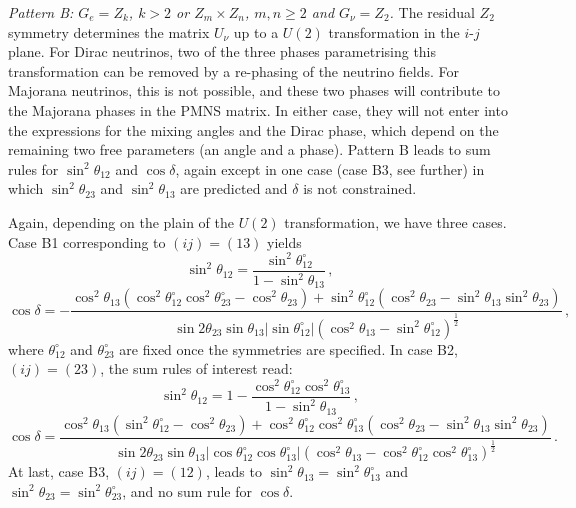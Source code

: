 \documentclass[11pt,a4paper]{article}
\newcommand{\be}{\begin{equation}}
\newcommand{\ee}{\end{equation}}
\def\th{\theta}
\numberwithin{equation}{section}
\begin{document}
 \textit{Pattern B: $G_e = Z_k$, $k > 2$ or $Z_m \times Z_n$, $m,n \geq 2$ 
and $G_{\nu} = Z_2$.} 
The residual $Z_2$ symmetry determines the matrix $U_\nu$ 
up to a $U(2)$ transformation in the $i$-$j$ plane. For Dirac neutrinos, 
two of the three phases parametrising this transformation can be removed 
by a re-phasing of the neutrino fields. For Majorana neutrinos, this is not possible, 
and these two phases will contribute to the Majorana phases in the PMNS matrix.
In either case, they will not enter into the expressions 
for the mixing angles and the Dirac phase, 
which depend on the remaining two free parameters (an angle and a phase).
Pattern B leads to sum rules for $\sin^2\th_{12}$ and $\cos\delta$, 
again except in one case (case B3, see further) in which 
$\sin^2\th_{23}$ and $\sin^2\th_{13}$ are predicted and 
$\delta$ is not constrained.

 Again, depending on the plain of the $U(2)$ transformation, 
we have three cases. 
Case B1 corresponding to $(ij) = (13)$ yields 
\be
\sin^2 \theta_{12} = \frac{\sin^2 \theta^{\circ}_{12}}{1 - \sin^2 \theta_{13}}\,,
\label{eq:ss12B1}
\ee
\be
\cos \delta = -\frac{\cos^2 \theta_{13} (\cos^2 \theta^{\circ}_{12} \cos^2 \theta^{\circ}_{23} - \cos^2 \theta_{23}) + \sin^2 \theta^{\circ}_{12} (\cos^2 \theta_{23} - \sin^2 \theta_{13} \sin^2 \theta_{23})}
{\sin 2 \theta_{23} \sin \theta_{13} |\sin \theta^{\circ}_{12}| (\cos^2 \theta_{13} - \sin^2 \theta^{\circ}_{12})^{\frac{1}{2}}}\,,
\label{eq:cosdeltaB1}
\ee
%
where $\th^\circ_{12}$ and $\th^\circ_{23}$ are fixed once the symmetries are specified.
In case B2, $(ij) = (23)$, the sum rules of interest read: 
\be
\sin^2 \theta_{12} = 1 - 
\frac{\cos^2\theta^{\circ}_{12} \cos^2\theta^{\circ}_{13}  }{1 - \sin^2\theta_{13}}\,,
\label{eq:ss12B2}
\ee
\be
\cos \delta = 
\frac{\cos^2 \theta_{13} (\sin^2 \theta^{\circ}_{12} - \cos^2 \theta_{23}) + \cos^2 \theta^{\circ}_{12} \cos^2 \theta^{\circ}_{13} ( \cos^2 \theta_{23} - \sin^2 \theta_{13} \sin^2 \theta_{23} )}
{ \sin 2 \theta_{23} \sin \theta_{13} | \cos \theta^{\circ}_{12} \cos \theta^{\circ}_{13}| (\cos^2 \theta_{13} - \cos^2 \theta^{\circ}_{12} \cos^2 \theta^{\circ}_{13} )^{\frac{1}{2}}}\,.
\label{eq:cosdeltaB2}
\ee
%
At last, case B3, $(ij) = (12)$, leads to 
$\sin^2\th_{13} = \sin^2\th^\circ_{13}$ and $\sin^2\th_{23} = \sin^2\th^\circ_{23}$, 
and no sum rule for $\cos\delta$.
\end{document}
